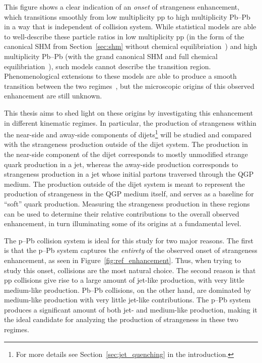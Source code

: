 This figure shows a clear indication of an \textit{onset} of strangeness enhancement, which transitions smoothly from low multiplicity pp to high multiplicity Pb--Pb in a way that is independent of collision system. While statistical models are able to well-describe these particle ratios in low multiplicity pp (in the form of the canonical SHM from Section~\ref{sec:shm} without chemical equilibriation~\cite{NATURE14, NATURE15}) and high multiplicity Pb--Pb (with the grand canonical SHM and full chemical equilibriation~\cite{NATURE12, NATURE13}), such models cannot describe the transition region. Phenomenological extensions to these models are able to produce a smooth transition between the two regimes~\cite{NATURE16, NATURE17}, but the microscopic origins of this observed enhancement are still unknown. 

This thesis aims to shed light on these origins by investigating this enhancement in different kinematic regimes. In particular, the production of strangeness within the near-side and away-side components of dijets\footnote{For more details see Section~\ref{sec:jet_quenching} in the introduction.} will be studied and compared with the strangeness production outside of the dijet system. The production in the near-side component of the dijet corresponds to mostly unmodified strange quark production in a jet, whereas the away-side production corresponds to strangeness production in a jet whose initial partons traversed through the QGP medium. The production outside of the dijet system is meant to represent the production of strangeness in the QGP medium itself, and serves as a baseline for ``soft'' quark production. Measuring the strangeness production in these regions can be used to determine their relative contributions to the overall observed enhancement, in turn illuminating some of its origins at a fundamental level.

The p--Pb collision system is ideal for this study for two major reasons. The first is that the p--Pb system captures the \textit{entirety} of the observed onset of strangeness enhancement, as seen in Figure~\ref{fig:ref_enhancement}. Thus, when trying to study this onset, \pPb collisions are the most natural choice. The second reason is that pp collisions give rise to a large amount of jet-like production, with very little medium-like production. Pb--Pb collisions, on the other hand, are dominated by medium-like production with very little jet-like contributions. The p--Pb system produces a significant amount of both jet- and medium-like production, making it the ideal candidate for analyzing the production of strangeness in these two regimes.

